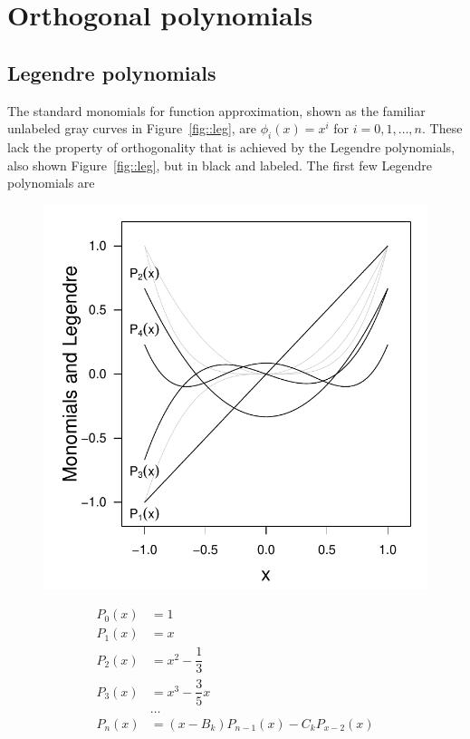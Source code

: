\documentclass[11pt]{article}
\begin{document}
\section{Orthogonal polynomials}
\subsection{Legendre polynomials}
The standard monomials for function approximation, shown as the familiar unlabeled gray curves in Figure~\ref{fig::leg}, are \(\phi_i(x) = x^i\) for \(i=0, 1, \dots, n\).  These lack the property of orthogonality that is achieved by the Legendre polynomials, also shown Figure~\ref{fig::leg}, but in black and labeled.  The first few Legendre polynomials are


\begin{figure}[h!]\centering

\begin{minipage}[c]{0.48\textwidth}
\includegraphics[width=\textwidth]{legendre_funs.pdf}

\end{minipage}
\begin{minipage}[c]{0.48\textwidth}
\begin{align*}
P_0(x) & = 1\\
P_1(x) & = x\\
P_2(x) & = x^2-\dfrac{1}{3}\\
P_3(x) & = x^3-\dfrac{3}{5}x\\
 & \dots\\
P_n(x) & = (x-B_k)P_{n-1}(x)-C_kP_{x-2}(x)
\end{align*}


\end{minipage}
\end{figure}
\end{document}
